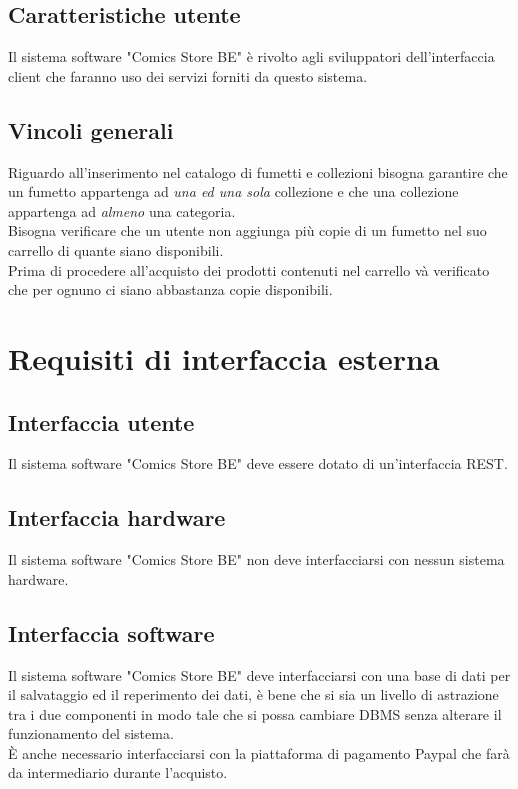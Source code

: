 \documentclass{scrreprt}
\begin{document}
\section{Caratteristiche utente}
Il sistema software "Comics Store BE" è rivolto agli sviluppatori dell'interfaccia client che faranno
uso dei servizi forniti da questo sistema.

\section{Vincoli generali}
Riguardo all'inserimento nel catalogo di fumetti e collezioni bisogna garantire che un fumetto appartenga ad
\emph{una ed una sola} collezione e che una collezione appartenga ad \emph{almeno} una categoria.\\
Bisogna verificare che un utente non aggiunga più copie di un fumetto nel suo carrello di quante siano disponibili.\\
Prima di procedere all'acquisto dei prodotti contenuti nel carrello và verificato che per ognuno ci siano abbastanza
copie disponibili.


\chapter{Requisiti di interfaccia esterna}

\section{Interfaccia utente}
Il sistema software "Comics Store BE" deve essere dotato di un'interfaccia REST.

\section{Interfaccia hardware}
Il sistema software "Comics Store BE" non deve interfacciarsi con nessun sistema hardware.

\section{Interfaccia software}
Il sistema software "Comics Store BE" deve interfacciarsi con una base di dati per il salvataggio ed il reperimento
dei dati, è bene che si sia un livello di astrazione tra i due componenti in modo tale che si possa cambiare DBMS senza
alterare il funzionamento del sistema.\\
È anche necessario interfacciarsi con la piattaforma di pagamento Paypal che farà da intermediario durante l'acquisto.
\end{document}
